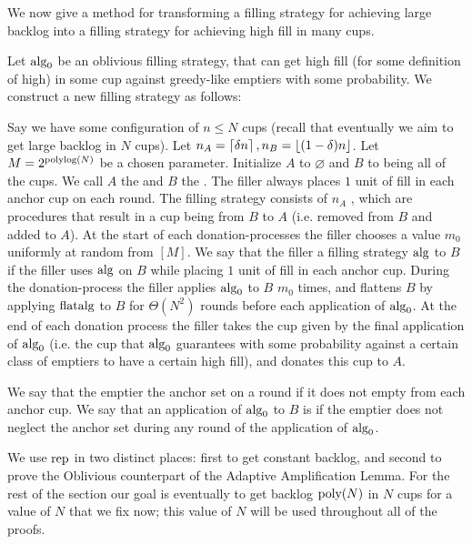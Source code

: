 We now give a method for transforming a filling strategy for
achieving large backlog into a filling strategy for achieving
high fill in many cups.
\begin{definition}
  \label{def:TO_rep}
  {\normalfont
  Let $\operatorname{\text{\textup{alg}}}_0$ be an oblivious filling strategy, that can get
  high fill (for some definition of high) in some cup against
  greedy-like emptiers with some probability. We construct a new
  filling strategy  as follows:

  Say we have some configuration of $n\le N$ cups (recall that
  eventually we aim to get large backlog in $N$ cups).
  Let $n_A = \left\lceil \delta n \right\rceil, n_B = \left\lfloor (1-\delta)n \right\rfloor$. Let
  $M=2^{\operatorname{\text{polylog}}(N)}$ be a chosen parameter. 
  Initialize $A$ to $\varnothing$ and $B$ to
  being all of the cups. We call $A$ the  and
  $B$ the . The filler always places $1$
  unit of fill in each anchor cup on each round. The filling
  strategy consists of $n_A$ , which are
  procedures that result in a cup being  from $B$
  to $A$ (i.e. removed from $B$ and added to $A$). At the start
  of each donation-processes the filler chooses a value $m_0$
  uniformly at random from $[M]$. We say that the filler
   a filling strategy $\operatorname{\text{\textup{alg}}}$ to $B$ if the
  filler uses $\operatorname{\text{\textup{alg}}}$ on $B$ while placing $1$ unit of fill
  in each anchor cup. During the donation-process the filler
  applies $\operatorname{\text{\textup{alg}}}_0$ to $B$ $m_0$ times, and flattens $B$ by
  applying $\operatorname{\text{\textup{flatalg}}}$ to $B$ for $\Theta(N^2)$ rounds before each
  application of $\operatorname{\text{\textup{alg}}}_0$. At the end of each donation process
  the filler takes the cup given by the final application of
  $\operatorname{\text{\textup{alg}}}_0$ (i.e. the cup that $\operatorname{\text{\textup{alg}}}_0$ guarantees with some
  probability against a certain class of emptiers to have a
  certain high fill), and donates this cup to $A$. 

We say that the emptier  the anchor set on a round
if it does not empty from each anchor cup. We say that an
application of $\operatorname{\text{\textup{alg}}}_0$ to $B$ is  if
the emptier does not neglect the anchor set during any round of
the application of $\operatorname{\text{\textup{alg}}}_0$.
}

\end{definition}

We use $\operatorname{\text{\textup{rep}}}$ in two distinct places: first to get constant
backlog, and second to prove the Oblivious counterpart of the
Adaptive Amplification Lemma.
For the rest of the section our goal is eventually to get backlog
$\operatorname{\text{poly}}(N)$ in $N$ cups for a value of $N$ that we fix now; this
value of $N$ will be used throughout all of the proofs.

